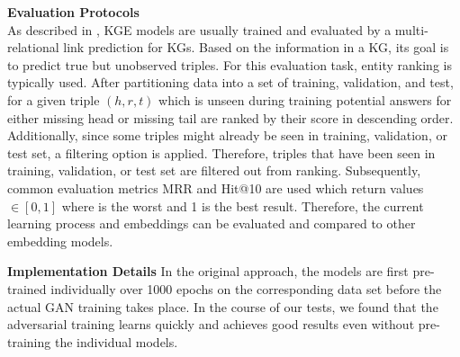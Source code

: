 \textbf{Evaluation Protocols}\\
As described in \cite{Ruffinelli2020You},
\ac{KGE} models are usually trained and evaluated by a multi-relational link prediction for \acp{KG}.
Based on the information in a \ac{KG}, its goal is to predict true but unobserved triples.
For this evaluation task, entity ranking is typically used.
After partitioning data into a set of training, validation, and test, for a given triple $(h,r,t)$ which is unseen during training potential answers for either missing head or missing tail are ranked by their score in descending order.
Additionally, since some triples might already be seen in training, validation, or test set, a filtering option is applied.
Therefore, triples that have been seen in training, validation, or test set are filtered out from ranking.
Subsequently, common evaluation metrics MRR and Hit@10 are used which return values $\in [0,1]$ where is the worst and 1 is the best result.
Therefore, the current learning process and embeddings can be evaluated and compared to other embedding models.

\textbf{Implementation Details}
In the original \kbgan approach, the models are first pre-trained individually over 1000 epochs on the corresponding data set before the actual \ac{GAN} training takes place.
In the course of our tests, we found that the adversarial training learns quickly and achieves good results even without pre-training the individual models.

